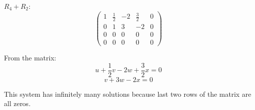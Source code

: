 $R_4 + R_2$:
\[
	\begin{pmatrix}
		1 & \frac{1}{2} & -2 & \frac{3}{2} & 0 \\
		0 & 1           & 3  & -2          & 0 \\
		0 & 0           & 0  & 0           & 0 \\
		0 & 0           & 0  & 0           & 0
	\end{pmatrix}
\]

From the matrix:
\[
	u + \frac{1}{2}v - 2w + \frac{3}{2}x = 0
\]
\[
	v + 3w - 2x = 0
\]

This system has infinitely many solutions because last two rows of the matrix are all zeros.